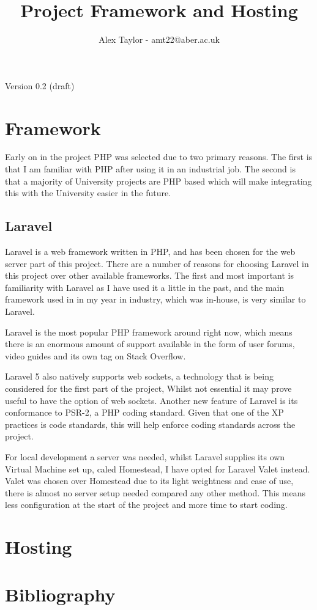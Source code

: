 \documentclass{article}
\title{Project Framework and Hosting}
\author{Alex Taylor - amt22@aber.ac.uk}
\begin{document}
\maketitle
\begin{center}
	Version 0.2 (draft)
\end{center}
\tableofcontents
\thispagestyle{empty}
\newpage

\section{Framework}
Early on in the project PHP was selected due to two primary reasons. The first is that I am familiar with PHP after using it in an industrial job. The second is that a majority of University projects are PHP based which will make integrating this with the University easier in the future.
\subsection{Laravel}
Laravel is a web framework written in PHP\cite{Laravel}, and has been chosen for the web server part of this project. There are a number of reasons for choosing Laravel in this project over other available frameworks. The first and most important is familiarity with Laravel as I have used it a little in the past, and the main framework used in in my year in industry, which was in-house, is very similar to Laravel.

Laravel is the most popular PHP framework around right now\cite{PopularPHPFrameworks}, which means there is an enormous amount of support available in the form of user forums, video guides and its own tag on Stack Overflow.

Laravel 5 also natively supports web sockets, a technology that is being considered for the first part of the project, Whilst not essential it may prove useful to have the option of web sockets. Another new feature of Laravel is its conformance to PSR-2, a PHP coding standard. Given that one of the XP practices is code standards, this will help enforce coding standards across the project.

For local development a server was needed, whilst Laravel supplies its own Virtual Machine set up, caled Homestead, I have opted for Laravel Valet\cite{Valet} instead. Valet was chosen over Homestead due to its light weightness and ease of use, there is almost no server setup needed compared any other method. This means less configuration at the start of the project and more time to start coding.

\newpage

\section{Hosting}
\newpage

\section{Bibliography}


%
\end{document}
